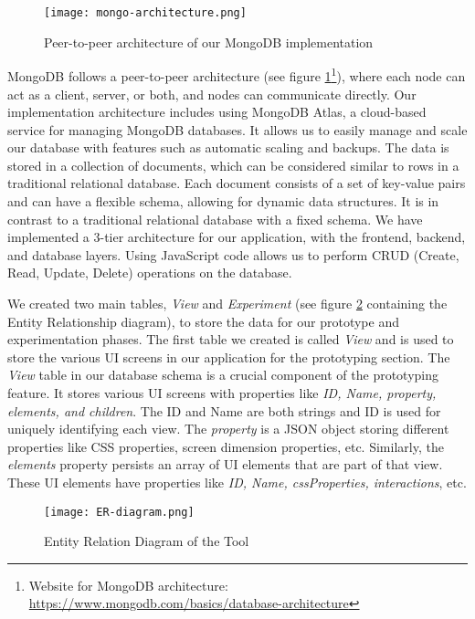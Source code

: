 \begin{figure}[ht]
    \centering
    \texttt{[image: mongo-architecture.png]}
    \caption[MongoDB Architecture]{Peer-to-peer architecture of our MongoDB implementation}
    \label{implementation:fig:mongoarchitecture}
\end{figure}

MongoDB follows a peer-to-peer architecture (see figure \ref{implementation:fig:mongoarchitecture}\footnote{Website for MongoDB architecture: \url{https://www.mongodb.com/basics/database-architecture}}), where each node can act as a client, server, or both, and nodes can communicate directly.
Our implementation architecture includes using MongoDB Atlas, a cloud-based service for managing MongoDB databases. It allows us to easily manage and scale our database with features such as automatic scaling and backups.
The data is stored in a collection of documents, which can be considered similar to rows in a traditional relational database. Each document consists of a set of key-value pairs and can have a flexible schema, allowing for dynamic data structures. It is in contrast to a traditional relational database with a fixed schema.
We have implemented a 3-tier architecture for our application, with the frontend, backend, and database layers. Using JavaScript code allows us to perform CRUD (Create, Read, Update, Delete) operations on the database.

We created two main tables, \textit{View} and \textit{Experiment} (see figure \ref{implementation:fig:erdb} containing the Entity Relationship diagram), to store the data for our prototype and experimentation phases. 
The first table we created is called \textit{View} and is used to store the various UI screens in our application for the prototyping section. 
The \textit{View} table in our database schema is a crucial component of the prototyping feature. 
It stores various UI screens with properties like \textit{ID, Name, property, elements, and children}. 
The ID and Name are both strings and ID is used for uniquely identifying each view. 
The \textit{property} is a JSON object storing different properties like CSS properties, screen dimension properties, etc. 
Similarly, the \textit{elements} property persists an array of UI elements that are part of that view. 
These UI elements have properties like \textit{ID, Name, cssProperties, interactions}, etc.

\begin{figure}[ht]
    \centering
    \texttt{[image: ER-diagram.png]}
    \caption[Entity Relation Diagram]{Entity Relation Diagram of the Tool}
    \label{implementation:fig:erdb}
\end{figure}

